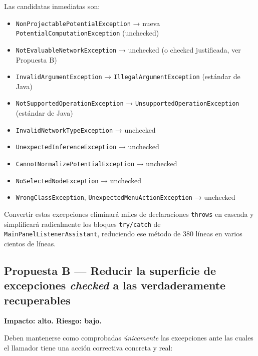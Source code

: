 \documentclass[11pt,a4paper]{article}
\begin{document}
Las candidatas inmediatas son:

\begin{itemize}
    \item \texttt{NonProjectablePotentialException} → nueva \texttt{PotentialComputationException} (unchecked)
    \item \texttt{NotEvaluableNetworkException} → unchecked (o checked justificada, ver Propuesta B)
    \item \texttt{InvalidArgumentException} → \texttt{IllegalArgumentException} (estándar de Java)
    \item \texttt{NotSupportedOperationException} → \texttt{UnsupportedOperationException} (estándar de Java)
    \item \texttt{InvalidNetworkTypeException} → unchecked
    \item \texttt{UnexpectedInferenceException} → unchecked
    \item \texttt{CannotNormalizePotentialException} → unchecked
    \item \texttt{NoSelectedNodeException} → unchecked
    \item \texttt{WrongClassException}, \texttt{UnexpectedMenuActionException} → unchecked
\end{itemize}

\begin{propuestabox}
    Convertir estas excepciones eliminará miles de declaraciones \texttt{throws} en cascada y
    simplificará radicalmente los bloques \texttt{try/catch} de \texttt{MainPanelListenerAssistant},
    reduciendo ese método de 380 líneas en varios cientos de líneas.
\end{propuestabox}

\subsection{Propuesta B — Reducir la superficie de excepciones \textit{checked} a las verdaderamente recuperables}

\textbf{Impacto: alto. Riesgo: bajo.}

Deben mantenerse como comprobadas \emph{únicamente} las excepciones ante las cuales el llamador
tiene una acción correctiva concreta y real:
\end{document}
